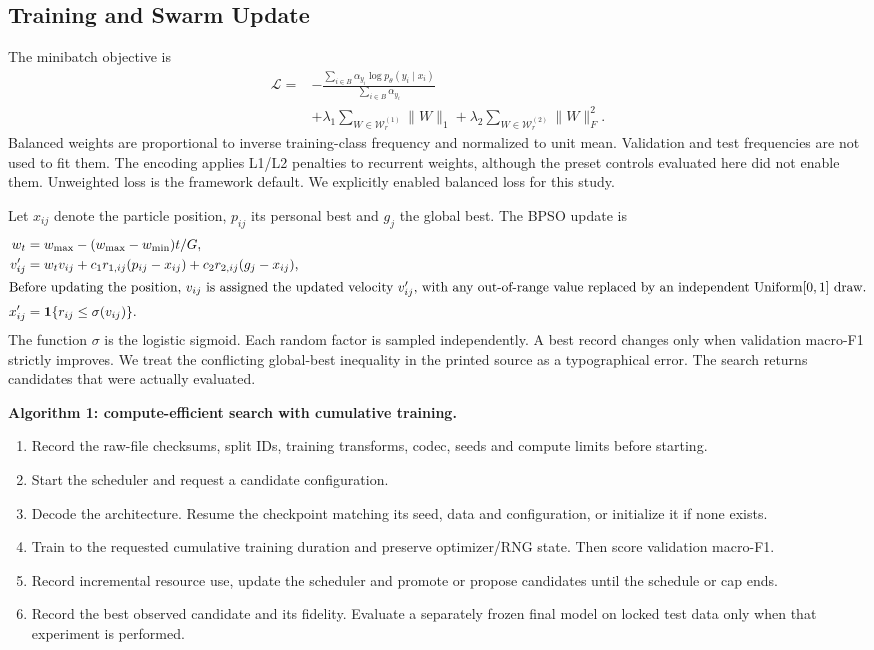 \subsection{Training and Swarm Update}
The minibatch objective is
\begin{equation}\begin{split}
 \mathcal L={}&-\frac{\sum_{i\in B}\alpha_{y_i}\log p_\theta(y_i\mid x_i)}{\sum_{i\in B}\alpha_{y_i}}\\
 &+\lambda_1\!\sum_{W\in\mathcal W_r^{(1)}}\|W\|_1
 +\lambda_2\!\sum_{W\in\mathcal W_r^{(2)}}\|W\|_F^2.
\end{split}\end{equation}
Balanced weights are proportional to inverse training-class frequency and normalized to unit mean. Validation and test frequencies are not used to fit them. The encoding applies L1/L2 penalties to recurrent weights, although the preset controls evaluated here did not enable them. Unweighted loss is the framework default. We explicitly enabled balanced loss for this study.

Let $x_{ij}$ denote the particle position, $p_{ij}$ its personal best and $g_j$ the global best. The BPSO update is
\begin{align}
 w_t&=w_{\max}-(w_{\max}-w_{\min})t/G,\\
 v'_{ij}&=w_tv_{ij}+c_1r_{1,ij}(p_{ij}-x_{ij})+c_2r_{2,ij}(g_j-x_{ij}),\\
\intertext{Before updating the position, $v_{ij}$ is assigned the updated velocity $v'_{ij}$, with any out-of-range value replaced by an independent Uniform$[0,1]$ draw.}
 x'_{ij}&=\mathbf{1}\{r_{ij}\leq\sigma(v_{ij})\}.
\end{align}
The function $\sigma$ is the logistic sigmoid. Each random factor is sampled independently. A best record changes only when validation macro-F1 strictly improves. We treat the conflicting global-best inequality in the printed source as a typographical error. The search returns candidates that were actually evaluated.

\noindent\textbf{Algorithm 1: compute-efficient search with cumulative training.}
\begin{enumerate}
\item Record the raw-file checksums, split IDs, training transforms, codec, seeds and compute limits before starting.
\item Start the scheduler and request a candidate configuration.
\item Decode the architecture. Resume the checkpoint matching its seed, data and configuration, or initialize it if none exists.
\item Train to the requested cumulative training duration and preserve optimizer/RNG state. Then score validation macro-F1.
\item Record incremental resource use, update the scheduler and promote or propose candidates until the schedule or cap ends.
\item Record the best observed candidate and its fidelity. Evaluate a separately frozen final model on locked test data only when that experiment is performed.
\end{enumerate}

